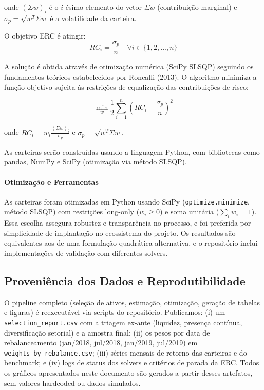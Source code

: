 onde $(\Sigma w)_i$ é o $i$-ésimo elemento do vetor $\Sigma w$ (contribuição marginal) e $\sigma_p = \sqrt{w^T \Sigma w}$ é a volatilidade da carteira.

O objetivo ERC é atingir:
\begin{equation}
RC_i = \frac{\sigma_p}{n} \quad \forall i \in \{1, 2, ..., n\}
\label{eq:erc_target}
\end{equation}

A solução é obtida através de otimização numérica (SciPy SLSQP) seguindo os fundamentos teóricos estabelecidos por Roncalli (2013). O algoritmo minimiza a função objetivo sujeita às restrições de equalização das contribuições de risco:

\begin{equation}
\min_{w} \frac{1}{2} \sum_{i=1}^n \left(RC_i - \frac{\sigma_p}{n}\right)^2
\label{eq:erc_objective}
\end{equation}

onde $RC_i = w_i \frac{(\Sigma w)_i}{\sigma_p}$ e $\sigma_p = \sqrt{w^T \Sigma w}$.

As carteiras serão construídas usando a linguagem Python, com bibliotecas como pandas, NumPy e SciPy (otimização via método SLSQP).

\paragraph{Otimização e Ferramentas}
As carteiras foram otimizadas em Python usando SciPy (\texttt{optimize.minimize}, método SLSQP) com restrições long-only ($w_i \geq 0$) e soma unitária ($\sum_i w_i = 1$). Essa escolha assegura robustez e transparência no processo, e foi preferida por simplicidade de implantação no ecossistema do projeto. Os resultados são equivalentes aos de uma formulação quadrática alternativa, e o repositório inclui implementações de validação com diferentes solvers.

\subsection{Proveniência dos Dados e Reprodutibilidade}

O pipeline completo (seleção de ativos, estimação, otimização, geração de tabelas e figuras) é reexecutável via scripts do repositório. Publicamos: (i) um \texttt{selection\_report.csv} com a triagem ex-ante (liquidez, presença contínua, diversificação setorial) e a amostra final; (ii) os pesos por data de rebalanceamento (jan/2018, jul/2018, jan/2019, jul/2019) em \texttt{weights\_by\_rebalance.csv}; (iii) séries mensais de retorno das carteiras e do benchmark; e (iv) logs de status dos solvers e critérios de parada da ERC. Todos os gráficos apresentados neste documento são gerados a partir desses artefatos, sem valores hardcoded ou dados simulados.

